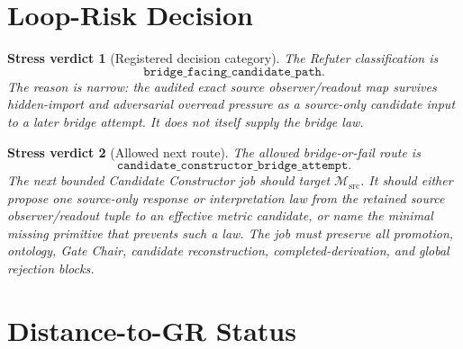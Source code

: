 \documentclass[11pt]{article}
\newcommand{\Msrc}{\mathcal{M}_{\mathrm{src}}}
\newtheorem{verdict}{Stress verdict}
\begin{document}
\section{Loop-Risk Decision}

\begin{verdict}[Registered decision category]
The Refuter classification is
\[
\texttt{bridge\_facing\_candidate\_path}.
\]
The reason is narrow: the audited exact source observer/readout map
survives hidden-import and adversarial overread pressure as a
source-only candidate input to a later bridge attempt. It does not
itself supply the bridge law.
\end{verdict}

\begin{verdict}[Allowed next route]
The allowed bridge-or-fail route is
\[
\texttt{candidate\_constructor\_bridge\_attempt}.
\]
The next bounded Candidate Constructor job should target \(\Msrc\).
It should either propose one source-only response or interpretation
law from the retained source observer/readout tuple to an effective
metric candidate, or name the minimal missing primitive that prevents
such a law. The job must preserve all promotion, ontology, Gate Chair,
candidate reconstruction, completed-derivation, and global rejection
blocks.
\end{verdict}

\section{Distance-to-GR Status}
\end{document}
